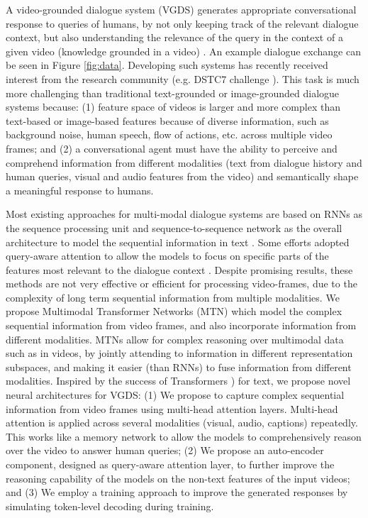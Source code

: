 \documentclass[11pt,a4paper]{article}
\begin{document}
A  video-grounded dialogue system (VGDS) generates appropriate conversational response to queries of humans, by not only keeping track of the relevant dialogue context, but also understanding the relevance of the query in the context of a given video (knowledge grounded in a video) \cite{hori2018end}. An example dialogue exchange can be seen in Figure \ref{fig:data}. Developing such systems has recently received interest from the research community (e.g. DSTC7 challenge \cite{DSTC7}). This task is much more challenging than traditional text-grounded or image-grounded dialogue systems because:
(1) feature space of videos is larger and more complex than text-based or image-based features because of diverse information, such as background noise, human speech, flow of actions, etc.  across multiple video frames; and (2) a conversational agent must have the ability to perceive and comprehend information from different modalities (text from dialogue history and human queries, visual and audio features from the video) and semantically shape a meaningful response to humans.  

Most existing approaches for multi-modal dialogue systems are based on RNNs as the sequence processing unit and sequence-to-sequence network as the overall architecture to model the sequential information in text \cite{das2017visual, das2017learning, hori2018end,kottur2018visual}. Some efforts adopted query-aware attention to allow the models to focus on specific parts of the features most relevant to the dialogue context \cite{hori2018end, kottur2018visual}.
Despite promising results, these methods are not very effective or efficient for processing video-frames, due to the complexity of long term sequential information from multiple modalities.
We propose Multimodal Transformer Networks (MTN) which model the complex sequential information from video frames, and also incorporate information from different modalities. 
MTNs allow for complex reasoning over multimodal data such as in videos, by jointly attending to information in different representation subspaces, and making it easier (than RNNs) to fuse information from different modalities. 
Inspired by the success of Transformers \cite{vaswani17attention}) for text, we propose novel neural architectures for VGDS:
(1) We propose to capture complex sequential information from video frames using multi-head attention layers. Multi-head attention is applied across several modalities (visual, audio, captions) repeatedly. This works like a memory network to allow the models to comprehensively reason over the video to answer human queries;
(2) We propose an auto-encoder component, designed as query-aware attention layer, to further improve the reasoning capability of the models on the non-text features of the input videos; and
(3) We employ a training approach to improve the generated responses by simulating token-level decoding during training. 
\end{document}
